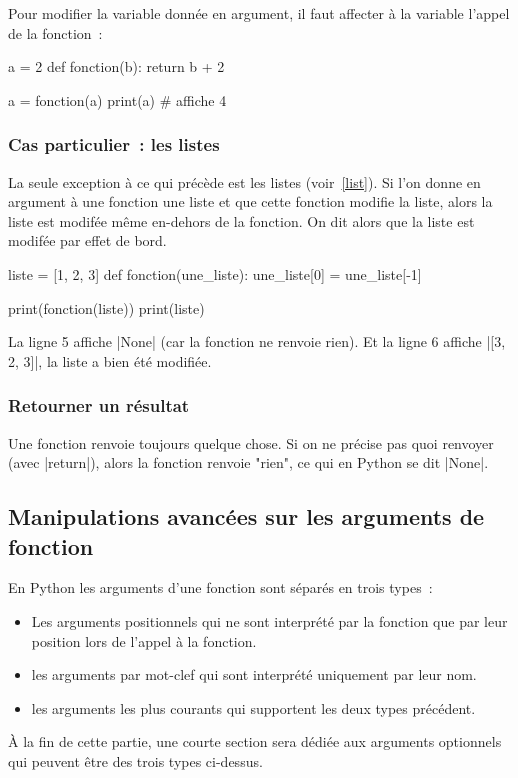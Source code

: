 		Pour modifier la variable donnée en argument, il faut affecter à la variable l'appel de la fonction~:
		
		\begin{pythoncode}
			a = 2
			def fonction(b):
				return b + 2
			
			a = fonction(a)
			print(a) # affiche 4
		\end{pythoncode}
		
		\subsubsection{Cas particulier~: les listes}
		La seule exception à ce qui précède est les listes (voir~\ref{list}). Si l'on donne en argument à une fonction une liste et que cette fonction modifie la liste, alors la liste est modifée même en-dehors de la fonction. On dit alors que la liste est modifée par effet de bord.
		
		\begin{pythoncode}
			liste = [1, 2, 3]
			def fonction(une_liste):
				une_liste[0] = une_liste[-1]
			
			print(fonction(liste))
			print(liste)
		\end{pythoncode}
		
		La ligne 5 affiche \python|None| (car la fonction ne renvoie rien). Et la ligne 6 affiche \python|[3, 2, 3]|, la liste a bien été modifiée.
	
		\subsubsection{Retourner un résultat}
		Une fonction renvoie toujours quelque chose. Si on ne précise pas quoi renvoyer (avec \python|return|), alors la fonction renvoie "rien", ce qui en Python se dit \python|None|.
	
	\subsection{Manipulations avancées sur les arguments de fonction}
		En Python les arguments d'une fonction sont séparés en trois types~:
		\begin{itemize}
			\item Les arguments positionnels qui ne sont interprété par la fonction que par leur position lors de l'appel à la fonction.
			\item les arguments par mot-clef qui sont interprété uniquement par leur nom.
			\item les arguments les plus courants qui supportent les deux types précédent.
		\end{itemize}
		À la fin de cette partie, une courte section sera dédiée aux arguments optionnels qui peuvent être des trois types ci-dessus.
		
